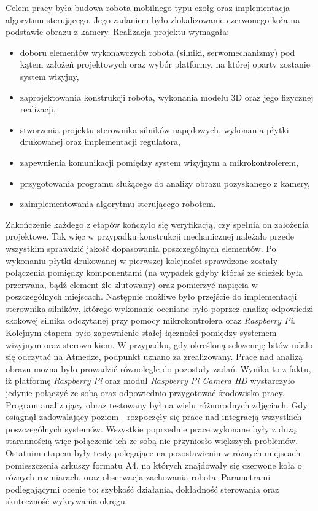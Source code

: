 Celem pracy była budowa robota mobilnego typu czołg oraz implementacja algorytmu sterującego. Jego zadaniem było zlokalizowanie czerwonego koła na podstawie obrazu z kamery. Realizacja projektu wymagała:
\begin{itemize}
\item doboru elementów wykonawczych robota (silniki, serwomechanizmy) pod kątem założeń projektowych oraz wybór platformy, na której oparty zostanie system wizyjny,
\item zaprojektowania konstrukcji robota, wykonania modelu 3D oraz jego fizycznej realizacji,
\item stworzenia projektu sterownika silników napędowych, wykonania płytki drukowanej oraz implementacji regulatora,
\item zapewnienia komunikacji pomiędzy system wizyjnym a mikrokontrolerem,
\item przygotowania programu służącego do analizy obrazu pozyskanego z kamery,
\item zaimplementowania algorytmu sterującego robotem.
\end{itemize}
Zakończenie każdego z etapów kończyło się weryfikacją, czy spełnia on założenia projektowe. Tak więc w przypadku konstrukcji mechanicznej należało przede wszystkim sprawdzić jakość dopasowania poszczególnych elementów. Po wykonaniu płytki drukowanej w pierwszej kolejności sprawdzone zostały połączenia pomiędzy komponentami (na wypadek gdyby któraś ze ścieżek była przerwana, bądź element źle zlutowany) oraz pomierzyć napięcia w poszczególnych miejscach. Następnie możliwe było przejście do implementacji sterownika silników, którego wykonanie oceniane było poprzez analizę odpowiedzi skokowej silnika odczytanej przy pomocy mikrokontrolera oraz \textit{Raspberry Pi}. Kolejnym etapem było zapewnienie stałej łączności pomiędzy systemem wizyjnym oraz sterownikiem. W przypadku, gdy określoną sekwencję bitów udało się odczytać na Atmedze, podpunkt uznano za zrealizowany. Prace nad analizą obrazu można było prowadzić równolegle do pozostały zadań. Wynika to z faktu, iż platformę \textit{Raspberry Pi} oraz moduł \textit{Raspberry Pi Camera HD} wystarczyło jedynie połączyć ze sobą oraz odpowiednio przygotować środowisko pracy. Program analizujący obraz testowany był na wielu różnorodnych zdjęciach. Gdy osiągnął zadowalający poziom - rozpoczęły się prace nad integracją wszystkich poszczególnych systemów. Wszystkie poprzednie prace wykonane były z dużą starannością więc połączenie ich ze sobą nie przyniosło większych problemów. Ostatnim etapem były testy polegające na pozostawieniu w różnych miejscach pomieszczenia arkuszy formatu A4, na których znajdowały się czerwone koła o różnych rozmiarach, oraz obserwacja zachowania robota. Parametrami podlegającymi ocenie to: szybkość działania, dokładność sterowania oraz skuteczność wykrywania okręgu.

